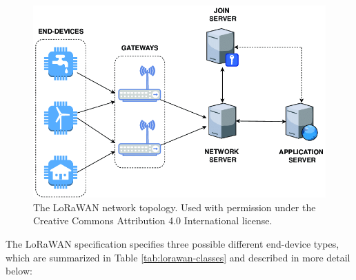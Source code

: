 \begin{figure}
    \centering
    \includegraphics[width=6in]{figures/lorawan-network-stack.png}
    \caption{The LoRaWAN network topology. Used with permission under the Creative Commons Attribution 4.0 International license. \cite{lorawan-network-stack}}
    \label{lorawan-network-stack}
\end{figure}

The LoRaWAN specification specifies three possible different end-device types, which are summarized in Table \ref{tab:lorawan-classes} and described in more detail below:

